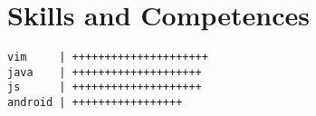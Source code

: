 \section*{Skills and Competences}
\begin{verbatim}
vim     | +++++++++++++++++++++
java    | ++++++++++++++++++++
js      | ++++++++++++++++++++
android | +++++++++++++++++
\end{verbatim}
